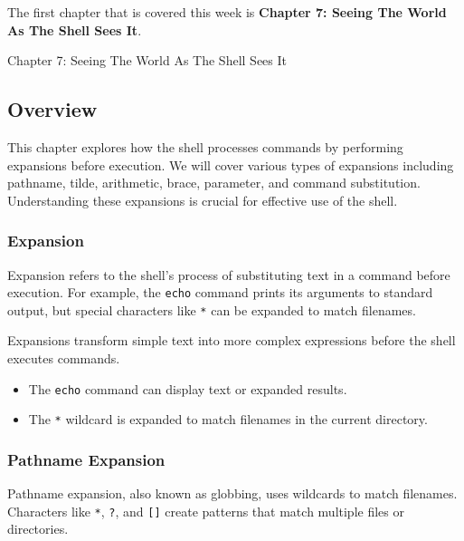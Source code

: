 The first chapter that is covered this week is \textbf{Chapter 7: Seeing The World As The Shell Sees It}.

\begin{notes}{Chapter 7: Seeing The World As The Shell Sees It}
    \subsection*{Overview}

    This chapter explores how the shell processes commands by performing expansions before execution. We will cover various types of expansions including pathname, tilde, arithmetic, brace, 
    parameter, and command substitution. Understanding these expansions is crucial for effective use of the shell.
    
    \subsubsection*{Expansion}
    
    Expansion refers to the shell's process of substituting text in a command before execution. For example, the \texttt{echo} command prints its arguments to standard output, but special characters 
    like \texttt{*} can be expanded to match filenames.
    
    \begin{highlight}[Expansion]
    
    Expansions transform simple text into more complex expressions before the shell executes commands.
    
    \begin{itemize}
        \item The \texttt{echo} command can display text or expanded results.
        \item The \texttt{*} wildcard is expanded to match filenames in the current directory.
    \end{itemize}
    
    \end{highlight}
    
    \subsubsection*{Pathname Expansion}
    
    Pathname expansion, also known as globbing, uses wildcards to match filenames. Characters like \texttt{*}, \texttt{?}, and \texttt{[]} create patterns that match multiple files or directories.
    

\end{notes}
